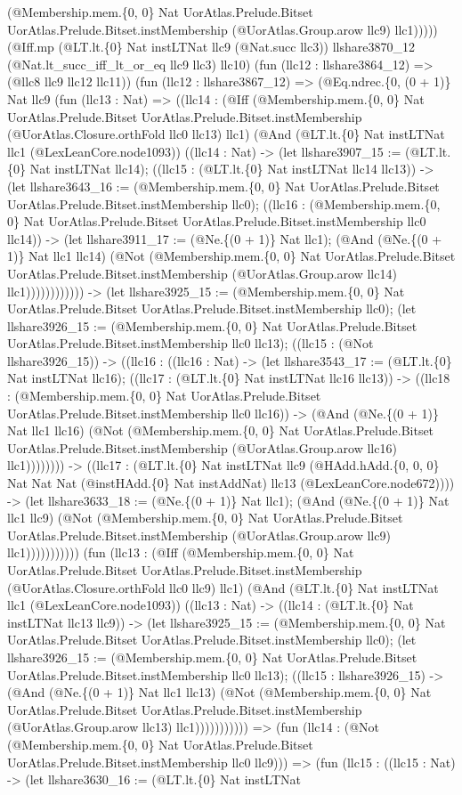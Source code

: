 \documentclass[11pt]{article}
\begin{document}
(@Membership.mem.\{0, 0\} Nat UorAtlas.Prelude.Bitset UorAtlas.Prelude.Bitset.instMembership (@UorAtlas.Group.arow llc9) llc1))))) (@Iff.mp (@LT.lt.\{0\} Nat instLTNat llc9 (@Nat.succ llc3)) llshare3870\_12 (@Nat.lt\_succ\_iff\_lt\_or\_eq llc9 llc3) llc10) (fun (llc12 : llshare3864\_12) => (@llc8 llc9 llc12 llc11)) (fun (llc12 : llshare3867\_12) => (@Eq.ndrec.\{0, (0 + 1)\} Nat llc9 (fun (llc13 : Nat) => ((llc14 : (@Iff (@Membership.mem.\{0, 0\} Nat UorAtlas.Prelude.Bitset UorAtlas.Prelude.Bitset.instMembership (@UorAtlas.Closure.orthFold llc0 llc13) llc1) (@And (@LT.lt.\{0\} Nat instLTNat llc1 (@LexLeanCore.node1093)) ((llc14 : Nat) -> (let llshare3907\_15 := (@LT.lt.\{0\} Nat instLTNat llc14); ((llc15 : (@LT.lt.\{0\} Nat instLTNat llc14 llc13)) -> (let llshare3643\_16 := (@Membership.mem.\{0, 0\} Nat UorAtlas.Prelude.Bitset UorAtlas.Prelude.Bitset.instMembership llc0); ((llc16 : (@Membership.mem.\{0, 0\} Nat UorAtlas.Prelude.Bitset UorAtlas.Prelude.Bitset.instMembership llc0 llc14)) -> (let llshare3911\_17 := (@Ne.\{(0 + 1)\} Nat llc1); (@And (@Ne.\{(0 + 1)\} Nat llc1 llc14) (@Not (@Membership.mem.\{0, 0\} Nat UorAtlas.Prelude.Bitset UorAtlas.Prelude.Bitset.instMembership (@UorAtlas.Group.arow llc14) llc1)))))))))))) -> (let llshare3925\_15 := (@Membership.mem.\{0, 0\} Nat UorAtlas.Prelude.Bitset UorAtlas.Prelude.Bitset.instMembership llc0); (let llshare3926\_15 := (@Membership.mem.\{0, 0\} Nat UorAtlas.Prelude.Bitset UorAtlas.Prelude.Bitset.instMembership llc0 llc13); ((llc15 : (@Not llshare3926\_15)) -> ((llc16 : ((llc16 : Nat) -> (let llshare3543\_17 := (@LT.lt.\{0\} Nat instLTNat llc16); ((llc17 : (@LT.lt.\{0\} Nat instLTNat llc16 llc13)) -> ((llc18 : (@Membership.mem.\{0, 0\} Nat UorAtlas.Prelude.Bitset UorAtlas.Prelude.Bitset.instMembership llc0 llc16)) -> (@And (@Ne.\{(0 + 1)\} Nat llc1 llc16) (@Not (@Membership.mem.\{0, 0\} Nat UorAtlas.Prelude.Bitset UorAtlas.Prelude.Bitset.instMembership (@UorAtlas.Group.arow llc16) llc1)))))))) -> ((llc17 : (@LT.lt.\{0\} Nat instLTNat llc9 (@HAdd.hAdd.\{0, 0, 0\} Nat Nat Nat (@instHAdd.\{0\} Nat instAddNat) llc13 (@LexLeanCore.node672)))) -> (let llshare3633\_18 := (@Ne.\{(0 + 1)\} Nat llc1); (@And (@Ne.\{(0 + 1)\} Nat llc1 llc9) (@Not (@Membership.mem.\{0, 0\} Nat UorAtlas.Prelude.Bitset UorAtlas.Prelude.Bitset.instMembership (@UorAtlas.Group.arow llc9) llc1))))))))))) (fun (llc13 : (@Iff (@Membership.mem.\{0, 0\} Nat UorAtlas.Prelude.Bitset UorAtlas.Prelude.Bitset.instMembership (@UorAtlas.Closure.orthFold llc0 llc9) llc1) (@And (@LT.lt.\{0\} Nat instLTNat llc1 (@LexLeanCore.node1093)) ((llc13 : Nat) -> ((llc14 : (@LT.lt.\{0\} Nat instLTNat llc13 llc9)) -> (let llshare3925\_15 := (@Membership.mem.\{0, 0\} Nat UorAtlas.Prelude.Bitset UorAtlas.Prelude.Bitset.instMembership llc0); (let llshare3926\_15 := (@Membership.mem.\{0, 0\} Nat UorAtlas.Prelude.Bitset UorAtlas.Prelude.Bitset.instMembership llc0 llc13); ((llc15 : llshare3926\_15) -> (@And (@Ne.\{(0 + 1)\} Nat llc1 llc13) (@Not (@Membership.mem.\{0, 0\} Nat UorAtlas.Prelude.Bitset UorAtlas.Prelude.Bitset.instMembership (@UorAtlas.Group.arow llc13) llc1))))))))))) => (fun (llc14 : (@Not (@Membership.mem.\{0, 0\} Nat UorAtlas.Prelude.Bitset UorAtlas.Prelude.Bitset.instMembership llc0 llc9))) => (fun (llc15 : ((llc15 : Nat) -> (let llshare3630\_16 := (@LT.lt.\{0\} Nat instLTNat 
\end{document}
